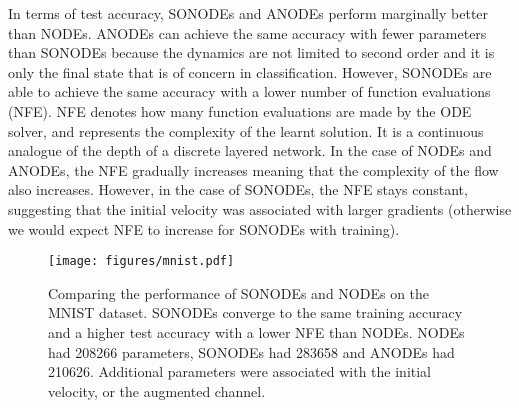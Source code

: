 \documentclass{article}
\theoremstyle{remark}
\theoremstyle{definition}
\begin{document}
In terms of test accuracy, SONODEs and ANODEs perform marginally better than NODEs. ANODEs can achieve the same accuracy with fewer parameters than SONODEs because the dynamics are not limited to second order and it is only the final state that is of concern in classification. However, SONODEs are able to achieve the same accuracy with a lower number of function evaluations (NFE). NFE denotes how many function evaluations are made by the ODE solver, and represents the complexity of the learnt solution. It is a continuous analogue of the depth of a discrete layered network. In the case of NODEs and ANODEs, the NFE gradually increases meaning that the complexity of the flow also increases. However, in the case of SONODEs, the NFE stays constant, suggesting that the initial velocity was associated with larger gradients (otherwise we would expect NFE to increase for SONODEs with training).


\begin{figure}[h]
    \centering
    \texttt{[image: figures/mnist.pdf]}
    \caption{Comparing the performance of SONODEs and NODEs on the MNIST dataset. SONODEs converge to the same training accuracy and a higher test accuracy with a lower NFE than NODEs. NODEs had 208266 parameters, SONODEs had 283658 and ANODEs had 210626. Additional parameters were associated with the initial velocity, or the augmented channel.}
    \label{fig: mnist}
\end{figure}
\end{document}

